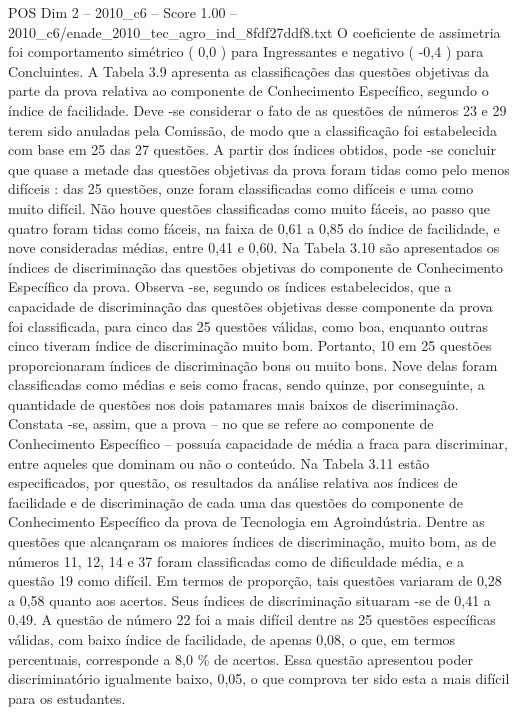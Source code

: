 \begin{textsample}{POS Dim 2 – 2010\_c6 – Score 1.00 – 2010\_c6/enade\_2010\_tec\_agro\_ind\_8fdf27ddf8.txt}
O coeficiente de assimetria foi comportamento simétrico ( 0,0 ) para Ingressantes e negativo ( -0,4 ) para Concluintes.
A Tabela 3.9 apresenta as classificações das questões objetivas da parte da prova relativa ao componente de Conhecimento Específico, segundo o índice de facilidade.
Deve -se considerar o fato de as questões de números 23 e 29 terem sido anuladas pela Comissão, de modo que a classificação foi estabelecida com base em 25 das 27 questões.
A partir dos índices obtidos, pode -se concluir que quase a metade das questões objetivas da prova foram tidas como pelo menos difíceis : das 25 questões, onze foram classificadas como difíceis e uma como muito difícil.
Não houve questões classificadas como muito fáceis, ao passo que quatro foram tidas como fáceis, na faixa de 0,61 a 0,85 do índice de facilidade, e nove consideradas médias, entre 0,41 e 0,60.
Na Tabela 3.10 são apresentados os índices de discriminação das questões objetivas do componente de Conhecimento Específico da prova.
Observa -se, segundo os índices estabelecidos, que a capacidade de discriminação das questões objetivas desse componente da prova foi classificada, para cinco das 25 questões válidas, como boa, enquanto outras cinco tiveram índice de discriminação muito bom.
Portanto, 10 em 25 questões proporcionaram índices de discriminação bons ou muito bons.
Nove delas foram classificadas como médias e seis como fracas, sendo quinze, por conseguinte, a quantidade de questões nos dois patamares mais baixos de discriminação.
Constata -se, assim, que a prova – no que se refere ao componente de Conhecimento Específico – possuía capacidade de média a fraca para discriminar, entre aqueles que dominam ou não o conteúdo.
Na Tabela 3.11 estão especificados, por questão, os resultados da análise relativa aos índices de facilidade e de discriminação de cada uma das questões do componente de Conhecimento Específico da prova de Tecnologia em Agroindústria.
Dentre as questões que alcançaram os maiores índices de discriminação, muito bom, as de números 11, 12, 14 e 37 foram classificadas como de dificuldade média, e a questão 19 como difícil.
Em termos de proporção, tais questões variaram de 0,28 a 0,58 quanto aos acertos.
Seus índices de discriminação situaram -se de 0,41 a 0,49.
A questão de número 22 foi a mais difícil dentre as 25 questões específicas válidas, com baixo índice de facilidade, de apenas 0,08, o que, em termos percentuais, corresponde a 8,0 \% de acertos.
Essa questão apresentou poder discriminatório igualmente baixo, 0,05, o que comprova ter sido esta a mais difícil para os estudantes.

\end{textsample}
